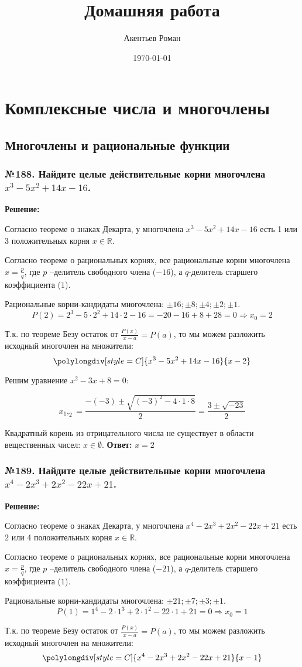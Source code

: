 \documentclass[a4paper]{article}
\title{Домашняя работа}
\author{Акентьев Роман}
\date\today
\begin{document}
\maketitle
\section*{Комплексные числа и многочлены}
\subsection*{Многочлены и рациональные функции}

\subsubsection*{№188. Найдите целые действительные корни многочлена $x^3-5x^2+14x-16$.}
\textbf{Решение:} \par

Согласно теореме о знаках Декарта, у многочлена $x^3-5x^2+14x-16$ есть 1 или 3 положительных корня $x \in \mathbb{R}$. \par
Согласно теореме о рациональных корнях, все рациональные корни многочлена $x=\frac{p}{q}$, где $p$ --делитель свободного члена ($-16$), а $q$-делитель старшего коэффициента ($1$). \par
Рациональные корни-кандидаты многочлена: $\pm16; \pm8; \pm4; \pm2; \pm1$.
\[P(2)=2^3-5\cdot2^2+14\cdot2-16=-20-16+8+28=0 \Rightarrow x_0=2\] \par
Т.к. по теореме Безу остаток от $\frac{P(x)}{x-a}=P(a)$, то мы можем разложить исходный многочлен на множители: 
\[\polylongdiv[style=C]{x^3-5x^2+14x-16}{x-2}\] \par
Решим уравнение $x^2-3x+8=0$: \par
\[x_1,_2=\frac{-(-3)\pm\sqrt{(-3)^2-4\cdot1\cdot8}}{2}=\frac{3\pm\sqrt{-23}}{2}\] \par
Квадратный корень из отрицательного числа не существует в области вещественных чисел: $x \in  \emptyset$. \newline
\textbf{Ответ:} $x=2$

\subsubsection*{№189. Найдите целые действительные корни многочлена $x^4-2x^3+2x^2-22x+21$.}
\textbf{Решение:} \par

Согласно теореме о знаках Декарта, у многочлена $x^4-2x^3+2x^2-22x+21$ есть 2 или 4 положительных корня $x \in \mathbb{R}$. \par
Согласно теореме о рациональных корнях, все рациональные корни многочлена $x=\frac{p}{q}$, где $p$ --делитель свободного члена ($-21$), а $q$-делитель старшего коэффициента ($1$). \par
Рациональные корни-кандидаты многочлена: $\pm21; \pm7; \pm3; \pm1$.
\[P(1)=1^4-2\cdot1^3+2\cdot1^2-22\cdot1+21=0 \Rightarrow x_0=1\] \par
Т.к. по теореме Безу остаток от $\frac{P(x)}{x-a}=P(a)$, то мы можем разложить исходный многочлен на множители: 
\[\polylongdiv[style=C]{x^4-2x^3+2x^2-22x+21}{x-1}\] \par
\end{document}
